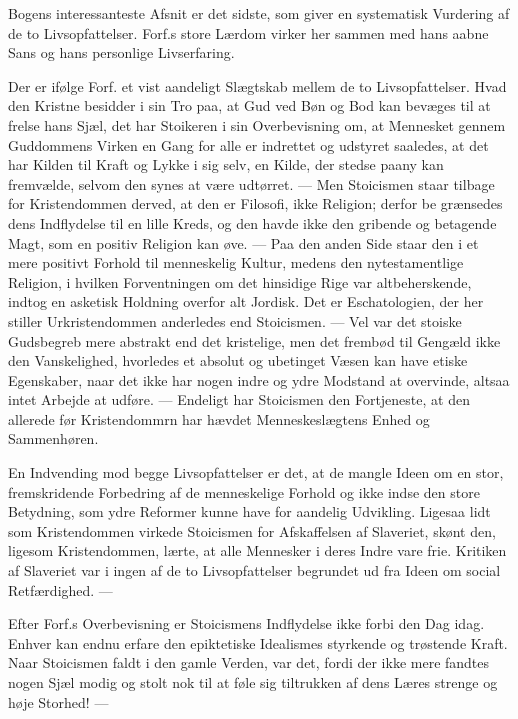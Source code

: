 \documentclass[12pt,a4paper,openany]{book}
\newcommand{\opage}[1]{\marginnote{\footnotesize\textit{[#1]}}}
\begin{document}
Bogens interessanteste Afsnit er det sidste, som giver en
systematisk Vurdering af de to Livsopfattelser. Forf.s store
Lærdom virker her sammen med hans aabne Sans og hans personlige
Livserfaring.

Der er ifølge Forf. et vist aandeligt Slægtskab mellem de
to Livsopfattelser. Hvad den Kristne besidder i sin Tro paa,
at Gud ved Bøn og Bod kan bevæges til at frelse hans Sjæl,
det har Stoikeren i sin Overbevisning om, at Mennesket gennem
Guddommens Virken en Gang for alle er indrettet og udstyret
saaledes, at det har Kilden til Kraft og Lykke i sig selv,
en Kilde, der stedse paany kan fremvælde, selvom den synes
at være udtørret. --- Men Stoicismen staar tilbage for Kristendommen
derved, at den er Filosofi, ikke Religion; derfor be%
\setcounter{footnote}{0}%
\opage{105}grænsedes dens Indflydelse til en lille Kreds, og den havde
ikke den gribende og betagende Magt, som en positiv Religion
kan øve. --- Paa den anden Side staar den i et mere positivt
Forhold til menneskelig Kultur, medens den nytestamentlige
Religion, i hvilken Forventningen om det hinsidige Rige var
altbeherskende, indtog en asketisk Holdning overfor alt Jordisk.
Det er Eschatologien, der her stiller Urkristendommen anderledes
end Stoicismen. --- Vel var det stoiske Gudsbegreb mere
abstrakt end det kristelige, men det frembød til Gengæld ikke
den Vanskelighed, hvorledes et absolut og ubetinget Væsen
kan have etiske Egenskaber, naar det ikke har nogen indre og
ydre Modstand at overvinde, altsaa intet Arbejde at udføre.
--- Endeligt har Stoicismen den Fortjeneste, at den allerede før
Kristendommrn har hævdet Menneskeslægtens Enhed og Sammenhøren.


En Indvending mod begge Livsopfattelser er det, at de
mangle Ideen om en stor, fremskridende Forbedring af de
menneskelige Forhold og ikke indse den store Betydning, som
ydre Reformer kunne have for aandelig Udvikling. Ligesaa
lidt som Kristendommen virkede Stoicismen for Afskaffelsen af
Slaveriet, skønt den, ligesom Kristendommen, lærte, at alle Mennesker
i deres Indre vare frie. Kritiken af Slaveriet var i ingen
af de to Livsopfattelser begrundet ud fra Ideen om social
Retfærdighed. ---

Efter Forf.s Overbevisning er Stoicismens Indflydelse ikke
forbi den Dag idag. Enhver kan endnu erfare den epiktetiske
Idealismes styrkende og trøstende Kraft. Naar Stoicismen faldt
i den gamle Verden, var det, fordi der ikke mere fandtes nogen
Sjæl modig og stolt nok til at føle sig tiltrukken af dens Læres
strenge og høje Storhed! ---
\end{document}
